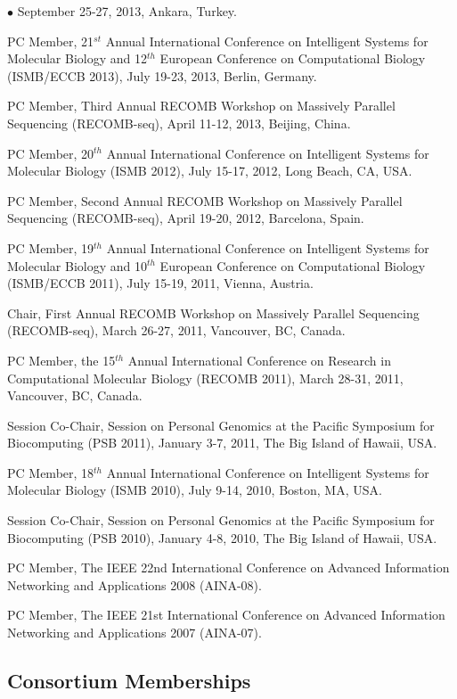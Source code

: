 \documentclass[margin,line]{res}
\newenvironment{list2}{
  \begin{list}{$\bullet$}{%
      \setlength{\itemsep}{0in}
      \setlength{\parsep}{0in} \setlength{\parskip}{0in}
      \setlength{\topsep}{0in} \setlength{\partopsep}{0in} 
      \setlength{\leftmargin}{0.2in}}}{\end{list}}
\begin{document}
\begin{resume}
\begin{list2}
  September 25-27, 2013, Ankara, Turkey.
\item
  PC Member, 21$^{st}$ Annual International Conference on Intelligent Systems for Molecular Biology and 12$^{th}$ European Conference on 
  Computational Biology  (ISMB/ECCB 2013), 
  July 19-23, 2013, Berlin, Germany.
\item
  PC Member, Third Annual RECOMB Workshop on Massively Parallel Sequencing (RECOMB-seq), April 11-12, 2013, Beijing, China.
\item
  PC Member, 20$^{th}$ Annual International Conference on Intelligent Systems for Molecular Biology
  (ISMB 2012), July 15-17, 2012, Long Beach, CA, USA. 
\item
  PC Member, Second Annual RECOMB Workshop on Massively Parallel Sequencing (RECOMB-seq), April 19-20, 2012, Barcelona, Spain.
\item
  PC Member, 19$^{th}$ Annual International Conference on Intelligent Systems for Molecular Biology
  and 10$^{th}$ European Conference on Computational Biology 
  (ISMB/ECCB 2011), July 15-19, 2011, Vienna, Austria.
\item
  Chair, First Annual RECOMB Workshop on Massively Parallel Sequencing (RECOMB-seq), March 26-27, 2011, Vancouver, BC, Canada.
\item
  PC Member, the 15$^{th}$ Annual International Conference on Research in Computational Molecular Biology
  (RECOMB 2011), March 28-31, 2011, Vancouver, BC, Canada.
\item 
  Session Co-Chair, Session on Personal Genomics at the Pacific Symposium for Biocomputing (PSB 2011),
  January 3-7, 2011, The Big Island of Hawaii, USA.
\item
  PC Member, 18$^{th}$ Annual International Conference on Intelligent Systems for Molecular Biology
  (ISMB 2010), July 9-14, 2010, Boston, MA, USA.
\item 
  Session Co-Chair, Session on Personal Genomics at the Pacific Symposium for Biocomputing (PSB 2010),
  January 4-8, 2010, The Big Island of Hawaii, USA.
\item
  PC Member, The IEEE 22nd International Conference on
  Advanced Information Networking and Applications 2008 (AINA-08).
\item
  PC Member, The IEEE 21st International Conference on
  Advanced Information Networking and Applications 2007 (AINA-07).
\end{list2}


\vspace{-0.6cm}
\subsection{\small \sc Consortium Memberships}


\end{resume}
\end{document}

